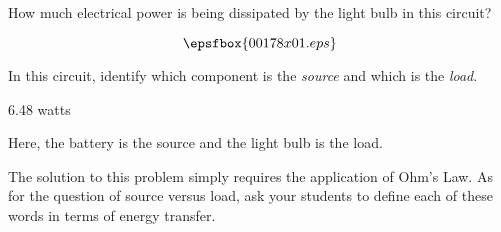 

How much electrical power is being dissipated by the light bulb in this circuit?

$$\epsfbox{00178x01.eps}$$

In this circuit, identify which component is the {\it source} and which is the {\it load}.







6.48 watts

\vskip 10pt

Here, the battery is the source and the light bulb is the load.







The solution to this problem simply requires the application of Ohm's Law.  As for the question of source versus load, ask your students to define each of these words in terms of energy transfer.




